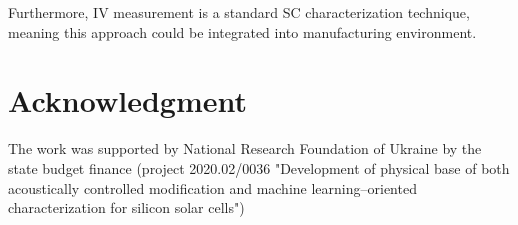 \documentclass[journal]{IEEEtran}
\begin{document}
Furthermore, IV measurement is a standard SC characterization technique,
meaning this approach could be integrated into manufacturing environment.




\section*{Acknowledgment}

The work was supported by National Research Foundation  of Ukraine by the state budget finance
(project 2020.02/0036 "Development of physical base of both acoustically controlled modification and machine learning--oriented characterization for silicon solar cells")

\ifCLASSOPTIONcaptionsoff
  \newpage
\fi






\end{document}
